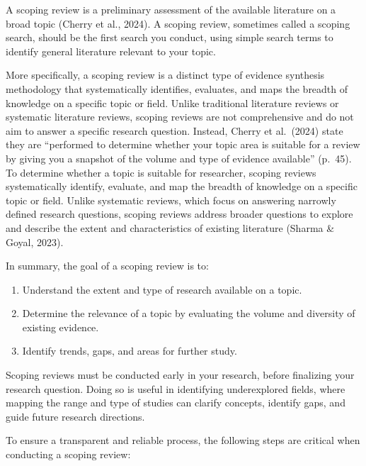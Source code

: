 \documentclass[
  letterpaper,
  DIV=11,
  numbers=noendperiod]{scrreprt}
\providecommand{\tightlist}{%
  \setlength{\itemsep}{0pt}\setlength{\parskip}{0pt}}\usepackage{longtable,booktabs,array}
\begin{document}

A scoping review is a preliminary assessment of the available literature
on a broad topic (Cherry et al., 2024). A scoping review, sometimes
called a scoping search, should be the first search you conduct, using
simple search terms to identify general literature relevant to your
topic.

More specifically, a scoping review is a distinct type of evidence
synthesis methodology that systematically identifies, evaluates, and
maps the breadth of knowledge on a specific topic or field. Unlike
traditional literature reviews or systematic literature reviews, scoping
reviews are not comprehensive and do not aim to answer a specific
research question. Instead, Cherry et al.~(2024) state they are
``performed to determine whether your topic area is suitable for a
review by giving you a snapshot of the volume and type of evidence
available'' (p.~45). To determine whether a topic is suitable for
researcher, scoping reviews systematically identify, evaluate, and map
the breadth of knowledge on a specific topic or field. Unlike systematic
reviews, which focus on answering narrowly defined research questions,
scoping reviews address broader questions to explore and describe the
extent and characteristics of existing literature (Sharma \& Goyal,
2023).

In summary, the goal of a scoping review is to:

\begin{enumerate}
\def\labelenumi{\arabic{enumi}.}
\tightlist
\item
  Understand the extent and type of research available on a topic.
\item
  Determine the relevance of a topic by evaluating the volume and
  diversity of existing evidence.
\item
  Identify trends, gaps, and areas for further study.
\end{enumerate}

Scoping reviews must be conducted early in your research, before
finalizing your research question. Doing so is useful in identifying
underexplored fields, where mapping the range and type of studies can
clarify concepts, identify gaps, and guide future research directions.

To ensure a transparent and reliable process, the following steps are
critical when conducting a scoping review:
\end{document}
